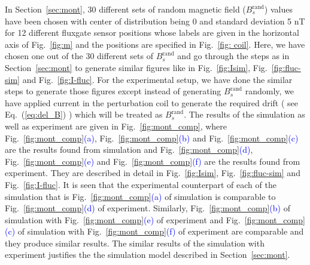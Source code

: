 In Section~\ref{sec:mont}, 30 different sets of random magnetic field ($B_s^{\text{rand}}$) values have been chosen with center of distribution being 0 and standard deviation 5 nT for 12 different fluxgate sensor positions whose labels are given in the horizontal axis of Fig.~\ref{fig:m} and the positions are specified in Fig.~\ref{fig: coil}. Here, we have chosen one out of the 30 different sets of $B_s^{\text{rand}}$ and go through the steps as in Section~\ref{sec:mont} to generate similar figures like in Fig.~\ref{fig:Isim}, Fig.~\ref{fig:fluc-sim} and Fig.~\ref{fig:I-fluc}. For the experimental setup, we have done the similar steps to generate those figures except instead of generating $B_s^{\text{rand}}$ randomly, we have applied current in the perturbation coil to generate the required drift ( see Eq.~(\ref{eq:del_B}) ) which will be treated as $B_s^{\text{rand}}$. The results of the simulation as well as experiment are given in Fig.~\ref{fig:mont_comp}, where Fig.~\ref{fig:mont_comp}\textcolor{blue}{(a)}, Fig.~\ref{fig:mont_comp}\textcolor{blue}{(b)} and Fig.~\ref{fig:mont_comp}\textcolor{blue}{(c)} are the results found from simulation and Fig.~\ref{fig:mont_comp}\textcolor{blue}{(d)}, Fig.~\ref{fig:mont_comp}\textcolor{blue}{(e)} and Fig.~\ref{fig:mont_comp}\textcolor{blue}{(f)} are the results found from experiment. They are described in detail in Fig.~\ref{fig:Isim}, Fig.~\ref{fig:fluc-sim} and Fig.~\ref{fig:I-fluc}. It is seen that the experimental counterpart of each of the simulation that is Fig.~\ref{fig:mont_comp}\textcolor{blue}{(a)} of simulation is comparable to Fig.~\ref{fig:mont_comp}\textcolor{blue}{(d)} of experiment. Similarly, Fig.~\ref{fig:mont_comp}\textcolor{blue}{(b)} of simulation with Fig.~\ref{fig:mont_comp}\textcolor{blue}{(e)} of experiment and Fig.~\ref{fig:mont_comp}\textcolor{blue}{(c)} of simulation with Fig.~\ref{fig:mont_comp}\textcolor{blue}{(f)} of experiment are comparable and they produce similar results. The similar results of the simulation with experiment justifies the the simulation model described in Section~\ref{sec:mont}.


